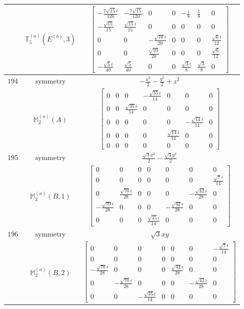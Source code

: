 \documentclass[fleqn,8pt,landscape]{jsarticle}
\begin{document}
\begin{longtable}{ccc}
$  $ & $ \mathbb{T}_{5}^{(a)}(E^{(b)},3) $ & $ \begin{bmatrix} - \frac{7 \sqrt{15} i}{120} & - \frac{7 \sqrt{15}}{120} & 0 & 0 & - \frac{i}{8} & \frac{1}{8} & 0 \\ - \frac{\sqrt{15}}{15} & \frac{\sqrt{15} i}{15} & 0 & 0 & 0 & 0 & 0 \\ 0 & 0 & - \frac{\sqrt{10} i}{20} & 0 & 0 & 0 & \frac{\sqrt{6} i}{12} \\ 0 & 0 & \frac{\sqrt{10}}{20} & 0 & 0 & 0 & \frac{\sqrt{6}}{12} \\ - \frac{\sqrt{5} i}{40} & \frac{\sqrt{5}}{40} & 0 & 0 & \frac{\sqrt{3} i}{8} & \frac{\sqrt{3}}{8} & 0 \end{bmatrix} $ \\ \hline
$ 194 $ & $ \text{symmetry} $ & $ - \frac{x^{2}}{2} - \frac{y^{2}}{2} + z^{2} $ \\
$  $ & $ \mathbb{M}_{2}^{(a)}(A) $ & $ \begin{bmatrix} 0 & 0 & 0 & - \frac{\sqrt{35} i}{14} & 0 & 0 & 0 \\ 0 & 0 & \frac{\sqrt{35} i}{14} & 0 & 0 & 0 & 0 \\ 0 & 0 & 0 & 0 & 0 & - \frac{\sqrt{14} i}{14} & 0 \\ 0 & 0 & 0 & 0 & \frac{\sqrt{14} i}{14} & 0 & 0 \\ 0 & 0 & 0 & 0 & 0 & 0 & 0 \end{bmatrix} $ \\ \hline
$ 195 $ & $ \text{symmetry} $ & $ \frac{\sqrt{3} x^{2}}{2} - \frac{\sqrt{3} y^{2}}{2} $ \\
$  $ & $ \mathbb{M}_{2}^{(a)}(B,1) $ & $ \begin{bmatrix} 0 & 0 & 0 & 0 & 0 & 0 & 0 \\ 0 & 0 & 0 & 0 & 0 & 0 & \frac{\sqrt{7} i}{14} \\ 0 & \frac{\sqrt{70} i}{28} & 0 & 0 & 0 & - \frac{\sqrt{42} i}{28} & 0 \\ - \frac{\sqrt{70} i}{28} & 0 & 0 & 0 & - \frac{\sqrt{42} i}{28} & 0 & 0 \\ 0 & 0 & 0 & \frac{\sqrt{35} i}{14} & 0 & 0 & 0 \end{bmatrix} $ \\ \hline
$ 196 $ & $ \text{symmetry} $ & $ \sqrt{3} x y $ \\
$  $ & $ \mathbb{M}_{2}^{(a)}(B,2) $ & $ \begin{bmatrix} 0 & 0 & 0 & 0 & 0 & 0 & - \frac{\sqrt{7} i}{14} \\ 0 & 0 & 0 & 0 & 0 & 0 & 0 \\ - \frac{\sqrt{70} i}{28} & 0 & 0 & 0 & \frac{\sqrt{42} i}{28} & 0 & 0 \\ 0 & - \frac{\sqrt{70} i}{28} & 0 & 0 & 0 & - \frac{\sqrt{42} i}{28} & 0 \\ 0 & 0 & - \frac{\sqrt{35} i}{14} & 0 & 0 & 0 & 0 \end{bmatrix} $ \\ \hline

\end{longtable}
\end{document}
